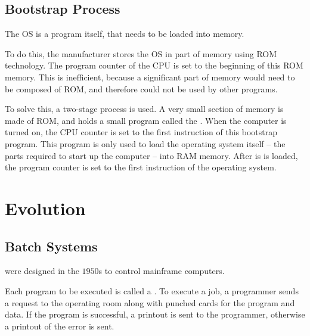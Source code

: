 \documentclass[\main/notes.tex]{subfiles}
\begin{document}
			\subsection{Bootstrap Process}
				The OS is a program itself, that needs to be loaded into memory.\par
				To do this, the manufacturer stores the OS in part of memory using ROM technology. The program counter of the CPU is set to the beginning of this ROM memory. This is inefficient, because a significant part of memory would need to be composed of ROM, and therefore could not be used by other programs.\par
				To solve this, a two-stage process is used. A very small section of memory is made of ROM, and holds a small program called the . When the computer is turned on, the CPU counter is set to the first instruction of this bootstrap program. This program is only used to load the operating system itself -- the parts required to start up the computer -- into RAM memory. After is is loaded, the program counter is set to the first instruction of the operating system.

		\pagebreak
		\section{Evolution}
			\subsection{Batch Systems}
				 were designed in the $1950$s to control mainframe computers.

				Each program to be executed is called a . To execute a job, a programmer sends a request to the operating room along with punched cards for the program and data. If the program is successful, a printout is sent to the programmer, otherwise a printout of the error is sent.
\end{document}
